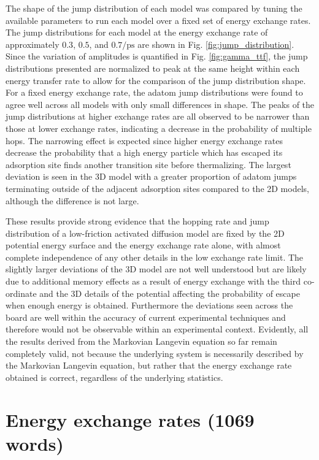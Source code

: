 \documentclass[7pt]{article}
\newcommand{\ips}{\si{\per\pico\second}}
\begin{document}
The shape of the jump distribution of each model was compared by tuning the available parameters to run each model over a fixed set of energy exchange rates. The jump distributions for each model at the energy exchange rate of approximately $0.3$, $0.5$, and $0.7\ips$ are shown in Fig. \ref{fig:jump_distribution}. Since the variation of amplitudes is quantified in Fig. \ref{fig:gamma_ttf}, the jump distributions presented are normalized to peak at the same height within each energy transfer rate to allow for the comparison of the jump distribution shape. For a fixed energy exchange rate, the adatom jump distributions were found to agree well across all models with only small differences in shape. The peaks of the jump distributions at higher exchange rates are all observed to be narrower than those at lower exchange rates, indicating a decrease in the probability of multiple hops\cite{Diamant}. The narrowing effect is expected since higher energy exchange rates decrease the probability that a high energy particle which has escaped its adsorption site finds another transition site before thermalizing. The largest deviation is seen in the 3D model with a greater proportion of adatom jumps terminating outside of the adjacent adsorption sites compared to the 2D models, although the difference is not large.  

These results provide strong evidence that the hopping rate and jump distribution of a low-friction activated diffusion model are fixed by the 2D potential energy surface and the energy exchange rate alone, with almost complete independence of any other details in the low exchange rate limit. The slightly larger deviations of the 3D model are not well understood but are likely due to additional memory effects as a result of energy exchange with the third co-ordinate and the 3D details of the potential affecting the probability of escape when enough energy is obtained. Furthermore the deviations seen across the board are well within the accuracy of current experimental techniques and therefore would not be observable within an experimental context. Evidently, all the results derived from the Markovian Langevin equation so far remain completely valid, not because the underlying system is necessarily described by the Markovian Langevin equation, but rather that the energy exchange rate obtained is correct, regardless of the underlying statistics.

\section*{Energy exchange rates (1069 words)}
\end{document}
